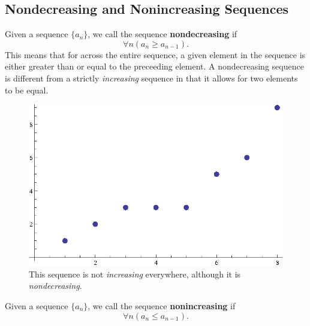 \subsection{Nondecreasing and Nonincreasing Sequences}\label{nondecreasing}
\begin{defn}
  Given a sequence \(\{a_n\}\), we call the sequence \textbf{nondecreasing} if
  \[\forall n (a_n \geq a_{n-1}).\]
  This means that for across the entire sequence, a given element in the sequence is either greater than or equal to the preceeding element.
  A nondecreasing sequence is different from a strictly \emph{increasing} sequence in that it allows for two elements to be equal.
  \begin{figure}[H]
    \begin{center}
      \includegraphics[scale=0.5]{continuous/sequence/nondecreasing}
    \end{center}
    \caption{This sequence is not \emph{increasing} everywhere, although it is \emph{nondecreasing}.}
  \end{figure}
\end{defn}
\begin{defn}
  Given a sequence \(\{a_n\}\), we call the sequence \textbf{nonincreasing} if
  \[\forall n (a_n \leq a_{n-1}).\]
\end{defn}
